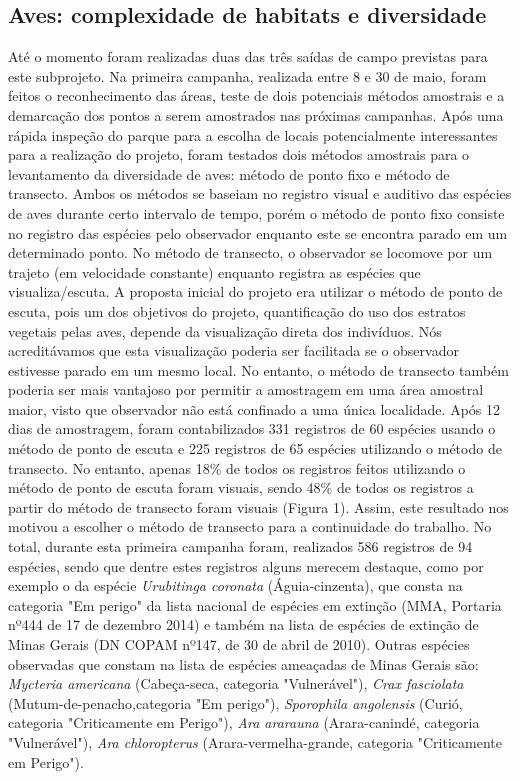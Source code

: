 \subsection{Aves: complexidade de habitats e diversidade} %
\label{sec:compl-de-habit} 


Até o momento foram realizadas duas das três saídas de campo previstas para este subprojeto. Na primeira campanha, realizada entre 8 e 30 de maio, foram feitos o reconhecimento das áreas, teste de dois potenciais métodos amostrais e a demarcação dos pontos a serem amostrados nas próximas campanhas. Após uma rápida inspeção do parque para a escolha de locais potencialmente interessantes para a realização do projeto, foram testados dois métodos amostrais para o levantamento da diversidade de aves: método de ponto fixo e método de transecto. Ambos os métodos se baseiam no registro visual e auditivo das espécies de aves durante certo intervalo de tempo, porém o método de ponto fixo consiste no registro das espécies pelo observador enquanto este se encontra parado em um determinado ponto. No método de transecto, o observador se locomove por um trajeto (em velocidade constante) enquanto registra as espécies que visualiza/escuta.
A proposta inicial do projeto era utilizar o método de ponto de escuta, pois um dos objetivos do projeto, quantificação do uso dos estratos vegetais pelas aves, depende da visualização direta dos indivíduos. Nós acreditávamos que esta visualização poderia ser facilitada se o observador estivesse parado em um mesmo local. No entanto, o método de transecto também poderia ser mais vantajoso por permitir a amostragem em uma área amostral maior, visto que observador não está confinado a uma única localidade. Após 12 dias de amostragem, foram contabilizados 331 registros de 60 espécies usando o método de ponto de escuta e 225 registros de 65 espécies utilizando o método de transecto. No entanto, apenas 18\% de todos os registros feitos utilizando o método de ponto de escuta foram visuais, sendo 48\% de todos os registros a partir do método de transecto foram visuais (Figura 1).
Assim, este resultado nos motivou a escolher o método de transecto para a continuidade do trabalho. 
No total, durante esta primeira campanha foram, realizados 586 registros de 94 espécies, sendo que dentre estes registros alguns merecem destaque, como por exemplo o da espécie \textit{Urubitinga coronata} (Águia-cinzenta), que consta na categoria "Em perigo" da lista nacional de espécies em extinção (MMA, Portaria nº444 de 17 de dezembro 2014) e também na lista de espécies de extinção de Minas Gerais (DN COPAM nº147, de 30 de abril de 2010). Outras espécies observadas que constam na lista de espécies ameaçadas de Minas Gerais são: \textit{Mycteria americana} (Cabeça-seca, categoria "Vulnerável"), \textit{Crax fasciolata} (Mutum-de-penacho,categoria "Em perigo"), \textit{Sporophila angolensis} (Curió, categoria "Criticamente em Perigo"), \textit{Ara ararauna}  (Arara-canindé, categoria "Vulnerável"), \textit{Ara chloropterus} (Arara-vermelha-grande, categoria "Criticamente em Perigo").
